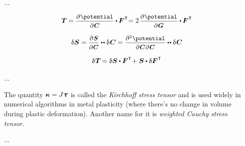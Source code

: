 \begin{otherlanguage}{russian}
...

\begin{equation*}
\firstpiolakirchhoffstress \hspace{-0.1ex}
= \scalebox{0.92}{$ \displaystyle \frac{\partial \hspace{.1ex} \potential}{\raisemath{-0.1em}{\partial \hspace{.1ex} \bm{C}}} $} \dotp \hspace{-0.1ex} \bm{F}^{\hspace{.1ex}\T} \hspace{-0.5ex}
= 2 \hspace{.25ex} \scalebox{0.92}{$ \displaystyle \frac{\partial \hspace{.1ex} \potential}{\raisemath{-0.1em}{\partial \hspace{.1ex} \bm{G}}} $} \dotp \hspace{-0.1ex} \bm{F}^{\hspace{.1ex}\T}
\end{equation*}

\begin{equation*}
\variation{\secondpiolakirchhoffstress}
= \scalebox{0.92}{$ \displaystyle \frac{\partial \hspace{.1ex} \bm{S}}{\raisemath{-0.1em}{\partial \hspace{.1ex} \bm{C}}} $} \dotdotp \variation{\hspace{.12ex}\bm{C}}
= \scalebox{0.92}{$ \displaystyle \frac{\partial^2 \hspace{0.1ex} \potential}{\raisemath{-0.1em}{\partial \hspace{0.1ex} \bm{C} \hspace{0.1ex} \partial \hspace{0.1ex} \bm{C}}} $} \dotdotp \variation{\hspace{.12ex}\bm{C}}
\end{equation*}

\begin{equation*}
\variation{\hspace{.1ex}\firstpiolakirchhoffstress} \hspace{-0.2ex} =
\variation{\secondpiolakirchhoffstress} \dotp \bm{F}^{\hspace{.1ex}\T} \hspace{-0.4ex} + \hspace{.1ex}
\secondpiolakirchhoffstress \dotp \variation{\bm{F}}^{\hspace{.1ex}\T}
\end{equation*}

...

{\small
The quantity ${\bm{\kappa} = J \cauchystress}$ is called the \emph{Kirchhoff stress tensor} and is used widely in numerical algorithms in metal plasticity (where there’s no change in volume during plastic deformation). Another name for it is \emph{weighted Cauchy stress tensor}.
\par}

...

\end{otherlanguage}

